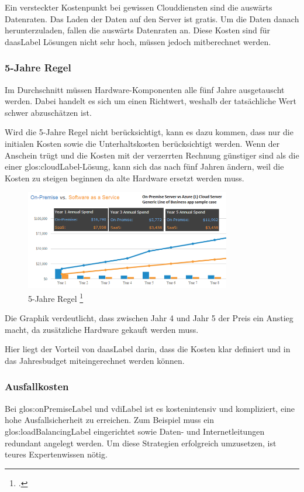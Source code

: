 Ein versteckter Kostenpunkt bei gewissen Clouddiensten sind die auswärts Datenraten. Das Laden  der Daten auf den Server ist gratis. Um die Daten danach herunterzuladen, fallen die auswärts Datenraten an. Diese Kosten sind für \Gls{daasLabel} Lösungen nicht sehr hoch, müssen jedoch mitberechnet werden.

\subsubsection{5-Jahre Regel}
Im Durchschnitt müssen Hardware-Komponenten alle fünf Jahre ausgetauscht werden. Dabei handelt es sich um einen Richtwert, weshalb der tatsächliche Wert schwer abzuschätzen ist.

Wird die 5-Jahre Regel nicht berücksichtigt, kann es dazu kommen, dass nur die initialen Kosten sowie die Unterhaltskosten berücksichtigt werden.
Wenn der Anschein trügt und die Kosten mit der verzerrten Rechnung günstiger sind als die einer \Gls{glos:cloudLabel}-Lösung, kann sich das nach fünf Jahren ändern, weil die Kosten zu steigen beginnen da alte Hardware ersetzt werden muss.

\begin{figure}[H]
	\includegraphics[width=0.8\textwidth]{images/five-year-rule}
	\caption[5-Jahre Regel]{5-Jahre Regel \protect\footcite{Comparing_cloud_vs_on-premise_Six_hidden_costs_people_always_forget_about}}
	\label{fig:fiveYearRuleImage}
\end{figure}
Die Graphik verdeutlicht, dass zwischen Jahr 4 und Jahr 5 der Preis ein Anstieg macht, da zusätzliche Hardware gekauft werden muss.

Hier liegt der Vorteil von \Gls{daasLabel} darin, dass die Kosten klar definiert und in das Jahresbudget miteingerechnet werden können.

\subsubsection{Ausfallkosten}
Bei \gls{glos:onPremiseLabel} und \Gls{vdiLabel} ist es kostenintensiv und kompliziert, eine hohe Ausfallsicherheit zu erreichen. Zum Beispiel muss ein \gls{glos:loadBalancingLabel} eingerichtet sowie Daten- und Internetleitungen redundant angelegt werden. Um diese Strategien erfolgreich umzusetzen, ist teures Expertenwissen nötig.

